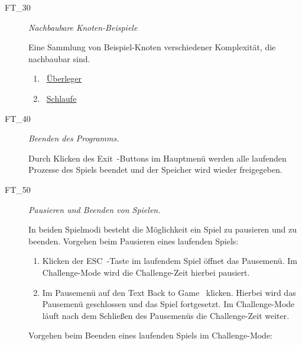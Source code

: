 \begin{description}
\begin{enumerate}
	\end{enumerate}
	
	
	\item[FT\_30] \textit{Nachbaubare Knoten-Beispiele} \hfill\\
	
	\label{FT:30}
	
	Eine Sammlung von Beispiel-Knoten verschiedener Komplexität, die nachbaubar sind.
	
	\begin{enumerate}
	
		\label{FT:30:Ueberleger}
		\item \mousecursor~\hyperref[Abb:Test-Knoten:Ueberleger]{\glqq Überleger\grqq}
		
		\label{FT:30:Schlaufe}
		\item \mousecursor~\hyperref[Abb:Test-Knoten:Schlaufe]{\glqq Schlaufe\grqq} 

	\end{enumerate}
	
	
	\item[FT\_40] \textit{Beenden des Programms.} \hfill\\
	
	\label{FT:40}
	
	Durch Klicken des \glqq Exit\grqq~-Buttons im Hauptmenü werden alle laufenden Prozesse des Spiels beendet und der Speicher wird wieder freigegeben.	
	
	\item[FT\_50] \textit{Pausieren und Beenden von Spielen.}  \hfill\\
	
	\label{FT:50}
	
	In beiden Spielmodi besteht die Möglichkeit ein Spiel zu pausieren und zu beenden. Vorgehen beim Pausieren eines laufenden Spiels:

	\begin{enumerate} 
	
		\item Klicken der \glqq ESC\grqq~-Taste im laufendem Spiel öffnet das Pausemenü. Im Challenge-Mode wird die Challenge-Zeit hierbei pausiert.
		\item Im Pausemenü auf den Text  \glqq Back to Game\grqq~ klicken. Hierbei wird das Pausemenü geschlossen und das Spiel fortgesetzt. Im Challenge-Mode läuft nach dem Schließen des Pausemenüs die Challenge-Zeit weiter.
	\end{enumerate}
	
	Vorgehen beim Beenden eines laufenden Spiels im Challenge-Mode:


\end{description}
